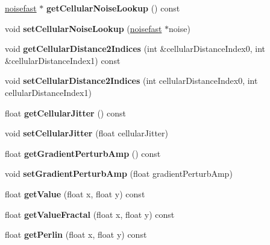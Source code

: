 \begin{DoxyCompactItemize}
\hyperlink{classnoisefast}{noisefast} $\ast$ {\bfseries get\+Cellular\+Noise\+Lookup} () const
\item 
\mbox{\label{classnoisefast_a627ce25ab9a1100d9844104c0e1971f6}} 
void {\bfseries set\+Cellular\+Noise\+Lookup} (\hyperlink{classnoisefast}{noisefast} $\ast$noise)
\item 
\mbox{\label{classnoisefast_a76f40aeed92089a18ff2abbde9664296}} 
void {\bfseries get\+Cellular\+Distance2\+Indices} (int \&cellular\+Distance\+Index0, int \&cellular\+Distance\+Index1) const
\item 
\mbox{\label{classnoisefast_af1958a697a63ea9d918b206eeabe57ce}} 
void {\bfseries set\+Cellular\+Distance2\+Indices} (int cellular\+Distance\+Index0, int cellular\+Distance\+Index1)
\item 
\mbox{\label{classnoisefast_aa5881e05420c77a5e91a10ad2924f182}} 
float {\bfseries get\+Cellular\+Jitter} () const
\item 
\mbox{\label{classnoisefast_a4c2373266d3c467d8b1a607c85674601}} 
void {\bfseries set\+Cellular\+Jitter} (float cellular\+Jitter)
\item 
\mbox{\label{classnoisefast_aabec524f089fbb3c71edce150785ef71}} 
float {\bfseries get\+Gradient\+Perturb\+Amp} () const
\item 
\mbox{\label{classnoisefast_a01cf73223483e8cf64904efcd0af5c7f}} 
void {\bfseries set\+Gradient\+Perturb\+Amp} (float gradient\+Perturb\+Amp)
\item 
\mbox{\label{classnoisefast_a729431bc8e394485981a0bc1408e6a85}} 
float {\bfseries get\+Value} (float x, float y) const
\item 
\mbox{\label{classnoisefast_a6a014d92f3dbbfde46023feb00a38367}} 
float {\bfseries get\+Value\+Fractal} (float x, float y) const
\item 
\mbox{\label{classnoisefast_a4dc6597580ada689d8998ccd2d2865eb}} 
float {\bfseries get\+Perlin} (float x, float y) const
\item 

\end{DoxyCompactItemize}
